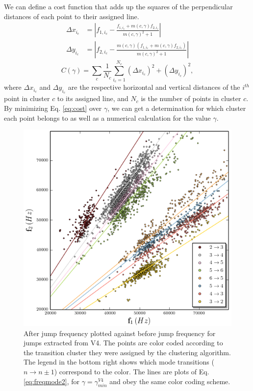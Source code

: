 \documentclass[superscriptaddress, twocolumn, prl]{revtex4}
\begin{document}
We can define a cost function that adds up the squares of the perpendicular distances of each point to their assigned line. 
\begin{align*}
\Delta x_{i_{c}} &= \left\vert f_{1,i_{c}}-\frac{f_{1,i_{c}}+m\left(c,\gamma\right)f_{2,i_{c}}}{m\left(c,\gamma\right)^{2}+1}\right\vert
\\ \Delta y_{i_c} &= \left\vert f_{2,i_{c}}-\frac{m\left(c,\gamma\right)\left(f_{1,i_{c}}+m\left(c,\gamma\right)f_{2,i_{c}}\right)}{m\left(c,\gamma\right)^{2}+1}  \right\vert
\end{align*}
\begin{equation}
\label{eq:cost}
C\left(\gamma\right)=\sum_{c}\frac{1}{N_{c}}\sum_{i_c=1}^{N_{c}}\left(\Delta x_{i_c}\right)^{2}+\left(\Delta y_{i_c}\right)^{2},
\end{equation}
where $\Delta x_{i_c}$ and $\Delta y_{i_c}$ are the respective horizontal and vertical distances of the $i^{th}$ point in cluster $c$ to its assigned line, and $N_{c}$ is the number of points in cluster $c$. By minimizing Eq. \ref{eq:cost} over $\gamma$, we can get a determination for which cluster each point belongs to as well as a numerical calculation for the value $\gamma$. 
\begin{figure}[!ht]
\centering
\includegraphics[width=\columnwidth]{V4.png}
\caption{\label{fig:jumps}After jump frequency plotted against before jump frequency for jumps extracted from V4. The points are color coded according to the transition cluster they were assigned by the clustering algorithm. The legend in the bottom right shows which mode transitions ($n\rightarrow n\pm1$) correspond to the color. The lines are plots of Eq. \ref{eq:freqmode2}, for $\gamma=\gamma_{min}^{V4}$ and obey the same color coding scheme.} 
\end{figure}
\end{document}

